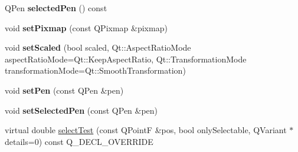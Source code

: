 \begin{DoxyCompactItemize}
\item 
Q\+Pen {\bfseries selected\+Pen} () const \hypertarget{class_q_c_p_item_pixmap_af8e839d7c7b84e214608feda3caec2bc}{}\label{class_q_c_p_item_pixmap_af8e839d7c7b84e214608feda3caec2bc}

\item 
void {\bfseries set\+Pixmap} (const Q\+Pixmap \&pixmap)\hypertarget{class_q_c_p_item_pixmap_a726b69ea4025edf48f9b29b6450548a7}{}\label{class_q_c_p_item_pixmap_a726b69ea4025edf48f9b29b6450548a7}

\item 
void {\bfseries set\+Scaled} (bool scaled, Qt\+::\+Aspect\+Ratio\+Mode aspect\+Ratio\+Mode=Qt\+::\+Keep\+Aspect\+Ratio, Qt\+::\+Transformation\+Mode transformation\+Mode=Qt\+::\+Smooth\+Transformation)\hypertarget{class_q_c_p_item_pixmap_ab4d44529a1c6c8d37d0ea7560e042777}{}\label{class_q_c_p_item_pixmap_ab4d44529a1c6c8d37d0ea7560e042777}

\item 
void {\bfseries set\+Pen} (const Q\+Pen \&pen)\hypertarget{class_q_c_p_item_pixmap_acdade1305edb4b5cae14f97fd132065f}{}\label{class_q_c_p_item_pixmap_acdade1305edb4b5cae14f97fd132065f}

\item 
void {\bfseries set\+Selected\+Pen} (const Q\+Pen \&pen)\hypertarget{class_q_c_p_item_pixmap_afc5e479e88e53740176ce77cb70dd67a}{}\label{class_q_c_p_item_pixmap_afc5e479e88e53740176ce77cb70dd67a}

\item 
virtual double \hyperlink{class_q_c_p_item_pixmap_aa2919a96737ed02f643fe138fb830712}{select\+Test} (const Q\+PointF \&pos, bool only\+Selectable, Q\+Variant $\ast$details=0) const Q\+\_\+\+D\+E\+C\+L\+\_\+\+O\+V\+E\+R\+R\+I\+DE
\end{DoxyCompactItemize}
